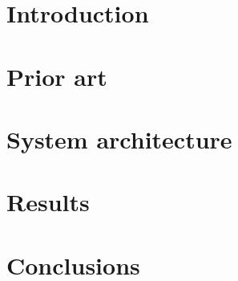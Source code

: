 \documentclass[twoside]{ctuthesis}
\theoremstyle{plain}
\theoremstyle{definition}
\theoremstyle{note}
\begin{document}
\maketitle


\chapter{Introduction}


\chapter{Prior art}


\chapter{System architecture}


\chapter{Results}



\chapter{Conclusions}


\printindex





\end{document}

